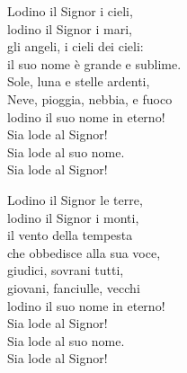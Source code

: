 
 

\spazio

\strofa Lodino il Signor i cieli,\\
lodino il Signor i mari,\\
gli angeli, i cieli dei cieli:\\
il suo nome è grande e sublime.\\
Sole, luna e stelle ardenti,\\
Neve, pioggia, nebbia, e fuoco\\
lodino il suo nome in eterno!\\
Sia lode al Signor!\\
Sia lode al suo nome.\\
Sia lode al Signor!

\spazio


\spazio

\strofa Lodino il Signor le terre,\\
lodino il Signor i monti,\\
il vento della tempesta\\
che obbedisce alla sua voce,\\
giudici, sovrani tutti,\\
giovani, fanciulle, vecchi\\
lodino il suo nome in eterno!\\
Sia lode al Signor!\\
Sia lode al suo nome.\\
Sia lode al Signor!

\spazio

